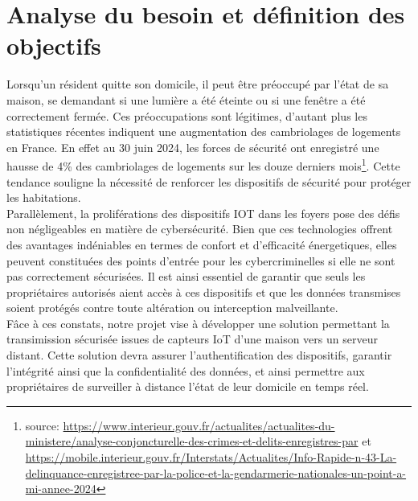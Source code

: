 \documentclass[10pt, a4paper]{report}
\begin{document}
	\section{Analyse du besoin et définition des objectifs}
		Lorsqu'un résident quitte son domicile, il peut être préoccupé par l'état de sa maison, se demandant si une lumière a été éteinte ou si une fenêtre a été correctement fermée. Ces préoccupations sont légitimes, d'autant plus les statistiques récentes indiquent une augmentation des cambriolages de logements en France. En effet au 30 juin 2024, les forces de sécurité ont enregistré une hausse de 4\% des cambriolages de logements sur les douze derniers mois\footnote{source: \url{https://www.interieur.gouv.fr/actualites/actualites-du-ministere/analyse-conjoncturelle-des-crimes-et-delits-enregistres-par} et \url{https://mobile.interieur.gouv.fr/Interstats/Actualites/Info-Rapide-n-43-La-delinquance-enregistree-par-la-police-et-la-gendarmerie-nationales-un-point-a-mi-annee-2024}}. Cette tendance souligne la nécessité de renforcer les dispositifs de sécurité pour protéger les habitations.\\
		Parallèlement, la proliférations des dispositifs IOT dans les foyers pose des défis non négligeables en matière de cybersécurité. Bien que ces technologies offrent des avantages indéniables en termes de confort et d'efficacité énergetiques, elles peuvent constituées des points d'entrée pour les cybercriminelles si elle ne sont pas correctement sécurisées. Il est ainsi essentiel de garantir que seuls les propriétaires autorisés aient accès à ces dispositifs et que les données transmises soient protégés contre toute altération ou interception malveillante.\\
		Fâce à ces constats, notre projet vise à développer une solution permettant la transimission sécurisée issues de capteurs IoT d'une maison vers un serveur distant. Cette solution devra assurer l'authentification des dispositifs, garantir l'intégrité ainsi que la confidentialité des données, et ainsi permettre aux propriétaires de surveiller à distance l'état de leur domicile en temps réel.
\end{document}
